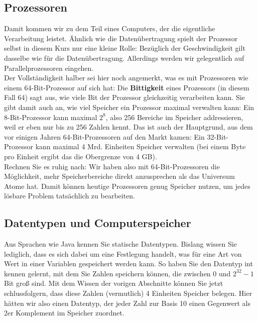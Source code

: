 \subsection{Prozessoren}

Damit kommen wir zu dem Teil eines Computers, der die eigentliche Verarbeitung leistet. Ähnlich wie die Datenübertragung spielt der Prozessor selbst in diesem Kurs nur eine kleine Rolle: Bezüglich der Geschwindigkeit gilt dasselbe wie für die Datenübertragung. Allerdings werden wir gelegentlich auf Parallelprozessoren eingehen.\\

Der Vollständigkeit halber sei hier noch angemerkt, was es mit Prozessoren wie einem 64-Bit-Prozessor auf sich hat: Die \textbf{Bittigkeit} eines Prozessors (in diesem Fall 64) sagt aus, wie viele Bit der Prozessor gleichzeitig verarbeiten kann. Sie gibt damit auch an, wie viel Speicher ein Prozessor maximal verwalten kann: Ein 8-Bit-Prozessor kann maximal \(2^8\), also 256 Bereiche im Speicher addressieren, weil er eben nur bis zu 256 Zahlen kennt. Das ist auch der Hauptgrund, aus dem vor einigen Jahren 64-Bit-Prozessoren auf den Markt kamen: Ein 32-Bit-Prozessor kann maximal 4 Mrd. Einheiten Speicher verwalten (bei einem Byte pro Einheit ergibt das die Obergrenze von 4 GB).\\

Rechnen Sie es ruhig nach: Wir haben also mit 64-Bit-Prozessoren die Möglichkeit, mehr Speicherbereiche direkt anzusprechen als das Universum Atome hat. Damit können heutige Prozessoren genug Speicher nutzen, um jedes lösbare Problem tatsächlich zu bearbeiten.

\subsection{Datentypen und Computerspeicher}

Aus Sprachen wie Java kennen Sie statische Datentypen. Bislang wissen Sie lediglich, dass es sich dabei um eine Festlegung handelt, was für eine Art von Wert in einer Variablen gespeichert werden kann. So haben Sie den Datentyp int kennen gelernt, mit dem Sie Zahlen speichern können, die zwischen 0 und \(2^{32}-1\) Bit groß sind. Mit dem Wissen der vorigen Abschnitte können Sie jetzt schlussfolgern, dass diese Zahlen (vermutlich) 4 Einheiten Speicher belegen. Hier hätten wir also einen Datentyp, der jeder Zahl zur Basis 10 einen Gegenwert als 2er Komplement im Speicher zuordnet.\\

